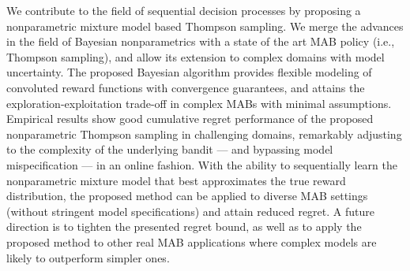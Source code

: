 \documentclass{article}
\newcommand{\ie}{i.e., }
\def\addappendix{}
\begin{document}
We contribute to the field of sequential decision processes by proposing a nonparametric mixture model based Thompson sampling. We merge the advances in the field of Bayesian nonparametrics with a state of the art MAB policy (\ie Thompson sampling), and allow its extension to complex domains with model uncertainty. The proposed Bayesian algorithm provides flexible modeling of convoluted reward functions with convergence guarantees, and attains the exploration-exploitation trade-off in complex MABs with minimal assumptions. Empirical results show good cumulative regret performance of the proposed nonparametric Thompson sampling in challenging domains, remarkably adjusting to the complexity of the underlying bandit --- and bypassing model mispecification --- in an online fashion. With the ability to sequentially learn the nonparametric mixture model that best approximates the true reward distribution, the proposed method can be applied to diverse MAB settings (without stringent model specifications) and attain reduced regret. A future direction is to tighten the presented regret bound, as well as to apply the proposed method to other real MAB applications where complex models are likely to outperform simpler ones.


%


\ifx\addappendix\undefined 
\end{document}
